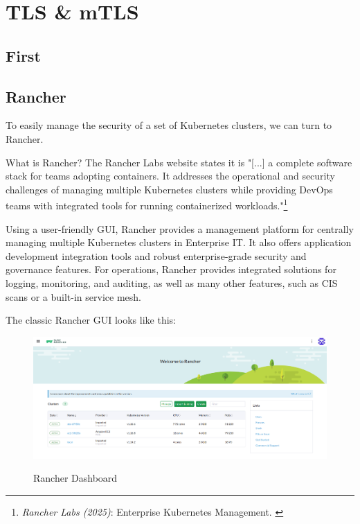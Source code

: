%
%

\pagebreak
\section{TLS \& mTLS}

\onehalfspacing

\subsection{First}

\subsection{Rancher}

To easily manage the security of a set of Kubernetes clusters, we can turn to Rancher.

What is Rancher? The Rancher Labs website states it is "[...] a complete software stack for teams adopting containers. It addresses the operational and security challenges of managing multiple Kubernetes clusters while providing DevOps teams with integrated tools for running containerized workloads."\footnote{\textit{Rancher Labs (2025)}: Enterprise Kubernetes Management. \cite{rancher}}

Using a user-friendly GUI, Rancher provides a management platform for centrally managing multiple Kubernetes clusters in Enterprise IT. It also offers application development integration tools and robust enterprise-grade security and governance features. For operations, Rancher provides integrated solutions for logging, monitoring, and auditing, as well as many other features, such as CIS scans or a built-in service mesh.

The classic Rancher GUI looks like this:

\begin{figure}[H]
\centering
\caption {Rancher Dashboard}
\includegraphics[width=\linewidth]{images/rancher-dashboard.png}
\label{fig:rancherDashboard}
\end{figure}

